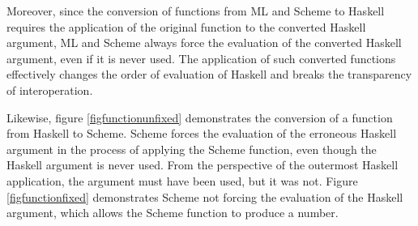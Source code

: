 Moreover, since the conversion of functions from ML and Scheme to Haskell requires the application of the original function to the converted Haskell argument, ML and Scheme always force the evaluation of the converted Haskell argument, even if it is never used. The application of such converted functions effectively changes the order of evaluation of Haskell and breaks the transparency of interoperation.





Likewise, figure \ref{figfunctionunfixed} demonstrates the conversion of a function from Haskell to Scheme. Scheme forces the evaluation of the erroneous Haskell argument in the process of applying the Scheme function, even though the Haskell argument is never used. From the perspective of the outermost Haskell application, the argument must have been used, but it was not. Figure \ref{figfunctionfixed} demonstrates Scheme not forcing the evaluation of the Haskell argument, which allows the Scheme function to produce a number.